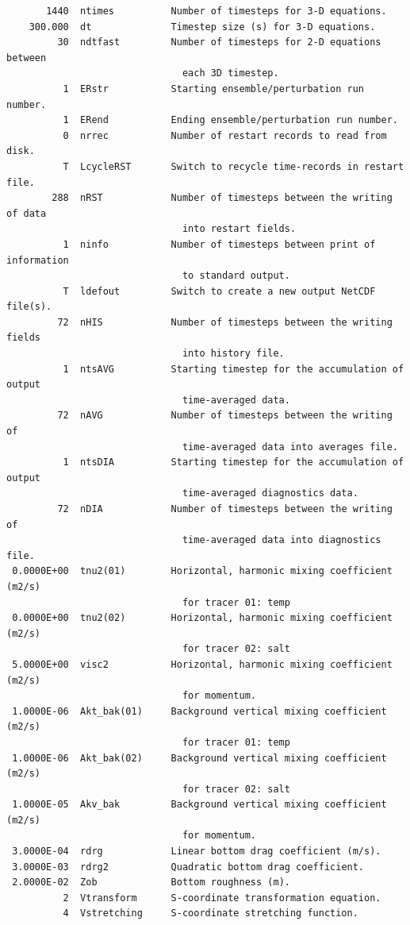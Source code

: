 \begin{verbatim}
       1440  ntimes          Number of timesteps for 3-D equations.
    300.000  dt              Timestep size (s) for 3-D equations.
         30  ndtfast         Number of timesteps for 2-D equations between
                               each 3D timestep.
          1  ERstr           Starting ensemble/perturbation run number.
          1  ERend           Ending ensemble/perturbation run number.
          0  nrrec           Number of restart records to read from disk.
          T  LcycleRST       Switch to recycle time-records in restart file.
        288  nRST            Number of timesteps between the writing of data
                               into restart fields.
          1  ninfo           Number of timesteps between print of information
                               to standard output.
          T  ldefout         Switch to create a new output NetCDF file(s).
         72  nHIS            Number of timesteps between the writing fields
                               into history file.
          1  ntsAVG          Starting timestep for the accumulation of output
                               time-averaged data.
         72  nAVG            Number of timesteps between the writing of
                               time-averaged data into averages file.
          1  ntsDIA          Starting timestep for the accumulation of output
                               time-averaged diagnostics data.
         72  nDIA            Number of timesteps between the writing of
                               time-averaged data into diagnostics file.
 0.0000E+00  tnu2(01)        Horizontal, harmonic mixing coefficient (m2/s)
                               for tracer 01: temp
 0.0000E+00  tnu2(02)        Horizontal, harmonic mixing coefficient (m2/s)
                               for tracer 02: salt
 5.0000E+00  visc2           Horizontal, harmonic mixing coefficient (m2/s)
                               for momentum.
 1.0000E-06  Akt_bak(01)     Background vertical mixing coefficient (m2/s)
                               for tracer 01: temp
 1.0000E-06  Akt_bak(02)     Background vertical mixing coefficient (m2/s)
                               for tracer 02: salt
 1.0000E-05  Akv_bak         Background vertical mixing coefficient (m2/s)
                               for momentum.
 3.0000E-04  rdrg            Linear bottom drag coefficient (m/s).
 3.0000E-03  rdrg2           Quadratic bottom drag coefficient.
 2.0000E-02  Zob             Bottom roughness (m).
          2  Vtransform      S-coordinate transformation equation.
          4  Vstretching     S-coordinate stretching function.

\end{verbatim}
